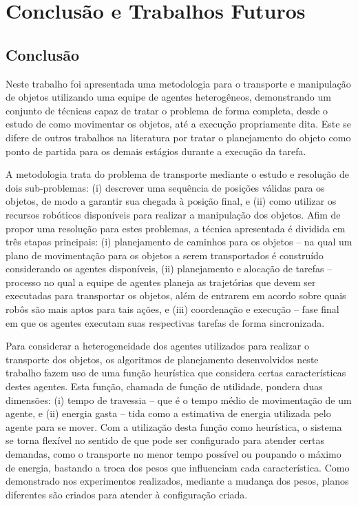 \chapter{Conclusão e Trabalhos Futuros} %
\label{cha:conclus_o}

\section{Conclusão} %
\label{sec:conclus_o}

Neste trabalho foi apresentada uma metodologia para o transporte e manipulação de objetos utilizando uma equipe de agentes heterogêneos, demonstrando um conjunto de técnicas capaz de tratar o problema de forma completa, desde o estudo de como movimentar os objetos, até a execução propriamente dita.
Este se difere de outros trabalhos na literatura por tratar o planejamento do objeto como ponto de partida para os demais estágios durante a execução da tarefa.

A metodologia trata do problema de transporte mediante o estudo e resolução de dois sub-problemas: (i) descrever uma sequência de posições válidas para os objetos, de modo a garantir sua chegada à posição final, e (ii) como utilizar os recursos robóticos disponíveis para realizar a manipulação dos objetos.
%
Afim de propor uma resolução para estes problemas, a técnica apresentada é dividida em três etapas principais: (i) planejamento de caminhos para os objetos -- na qual um plano de movimentação para os objetos a serem transportados é construído considerando os agentes disponíveis, (ii) planejamento e alocação de tarefas -- processo no qual a equipe de agentes planeja as trajetórias que devem ser executadas para transportar os objetos, além de entrarem em acordo sobre quais robôs são mais aptos para tais ações, e (iii) coordenação e execução -- fase final em que os agentes executam suas respectivas tarefas de forma sincronizada.

Para considerar a heterogeneidade dos agentes utilizados para realizar o transporte dos objetos, os algoritmos de planejamento desenvolvidos neste trabalho fazem uso de uma função heurística que considera certas características destes agentes.
Esta função, chamada de função de utilidade, pondera duas dimensões: (i) tempo de travessia -- que é o tempo médio de movimentação de um agente, e (ii) energia gasta -- tida como a estimativa de energia utilizada pelo agente para se mover.
Com a utilização desta função como heurística, o sistema se torna flexível no sentido de que pode ser configurado para atender certas demandas, como o transporte no menor tempo possível ou poupando o máximo de energia, bastando a troca dos pesos que influenciam cada característica.
Como demonstrado nos experimentos realizados, mediante a mudança dos pesos, planos diferentes são criados para atender à configuração criada.

